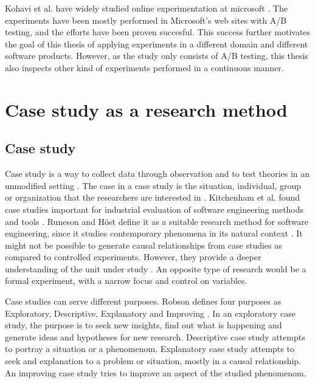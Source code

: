 \documentclass[english, grading]{tktltiki2}
\theoremstyle{definition}
\theoremstyle{remark}
\begin{document}
Kohavi et al. have widely studied online experimentation at microsoft \cite{kohavi2009online}. The experiments have been mostly performed in Microsoft's web sites with A/B testing, and the efforts have been proven succesful. This success further motivates the goal of this thesis of applying experiments in a different domain and different software products. However, as the study only consists of A/B testing, this thesis also inspects other kind of experiments performed in a continuous manner.

\section{Case study as a research method}

\subsection{Case study}
Case study is a way to collect data through observation and to test theories in an unmodified setting \cite{zelkowitz1998experimental}. The case in a case study is the situation, individual, group or organization that the researchers are interested in \cite{robson2002real}. Kitchenham et al. found case studies important for industrial evaluation of software engineering methods and tools \cite{kitchenham1995case}. Runeson and Höst define it as a suitable research method for software engineering, since it studies contemporary phenomena in its natural context \cite{runeson2009guidelines}. It might not be possible to generate causal relationships from case studies as compared to controlled experiments. However, they provide a deeper understanding of the unit under study \cite{runeson2009guidelines}. An opposite type of research would be a formal experiment, with a narrow focus and control on variables. 

Case studies can serve different purposes. Robson defines four purposes as Exploratory, Descriptive, Explanatory and Improving \cite{robson2002real}. In an exploratory case study, the purpose is to seek new insights, find out what is happening and generate ideas and hypotheses for new research. Descriptive case study attempts to portray a situation or a phenomenom. Explanatory case study attempts to seek and explanation to a problem or situation, mostly in a causal relationship. An improving case study tries to improve an aspect of the studied phenomenom.  
\end{document}
